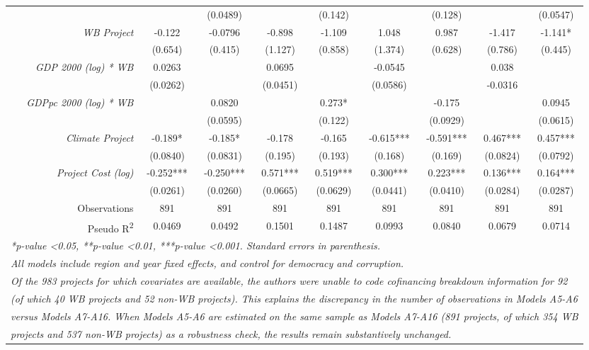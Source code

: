 \documentclass{article}
\begin{document}
\begin{singlespace}
\begin{table}[H]
{\begin{tabular}{rcccccccc}
			\textit{} &  & (0.0489) &  & (0.142) &  & (0.128) &  & (0.0547) \\
			\textit{WB Project} & -0.122 & -0.0796 & -0.898 & -1.109 & 1.048 & 0.987 & -1.417 & -1.141* \\
			\textit{} & (0.654) & (0.415) & (1.127) & (0.858) & (1.374) & (0.628) & (0.786) & (0.445) \\
			\textit{GDP 2000 (log) * WB} & 0.0263 &  & 0.0695 &  & -0.0545 &  & 0.038 &  \\
			\textit{} & (0.0262) &  & (0.0451) &  & (0.0586) &  & -0.0316 &  \\
			\textit{GDPpc 2000 (log) * WB} &  & 0.0820 &  & 0.273* &  & -0.175 &  & 0.0945 \\
			\textit{} &  & (0.0595) &  & (0.122) &  & (0.0929) &  & (0.0615) \\
			\textit{Climate Project} & -0.189* & -0.185* & -0.178 & -0.165 & -0.615*** & -0.591*** & 0.467*** & 0.457*** \\
			\textit{} & (0.0840) & (0.0831) & (0.195) & (0.193) & (0.168) & (0.169) & (0.0824) & (0.0792) \\
			\textit{Project Cost (log)} & -0.252*** & -0.250*** & 0.571*** & 0.519*** & 0.300*** & 0.223*** & 0.136*** & 0.164*** \\
			\textit{} & (0.0261) & (0.0260) & (0.0665) & (0.0629) & (0.0441) & (0.0410) & (0.0284) & (0.0287) \\ \hline
			Observations & 891 & 891 & 891 & 891 & 891 & 891 & 891 & 891 \\
			Pseudo R\textsuperscript{2} & 0.0469 & 0.0492 & 0.1501 & 0.1487 & 0.0993 & 0.0840 & 0.0679 & 0.0714 \\ \hline
			\multicolumn{9}{l}{\textit{*p-value \textless 0.05, **p-value \textless 0.01, ***p-value \textless 0.001.  Standard errors in parenthesis.}} \\
			\multicolumn{9}{l}{\textit{All models include region and year fixed effects, and control for democracy and corruption.}} \\
			\multicolumn{9}{l}{\textit{Of the 983 projects for which covariates are available, the authors were unable to code cofinancing breakdown information for 92}} \\
			\multicolumn{9}{l}{\textit{(of which 40 WB projects and 52 non-WB projects). This explains the discrepancy in the number of observations in Models A5-A6}} \\
			\multicolumn{9}{l}{\textit{versus Models A7-A16. When Models A5-A6 are estimated on the same sample as Models A7-A16 (891 projects, of which 354 WB}} \\
			\multicolumn{9}{l}{\textit{projects and 537 non-WB projects) as a robustness check, the results remain substantively unchanged.}}
		\end{tabular}%
	}
\end{table}
\end{singlespace}	
\end{document}
